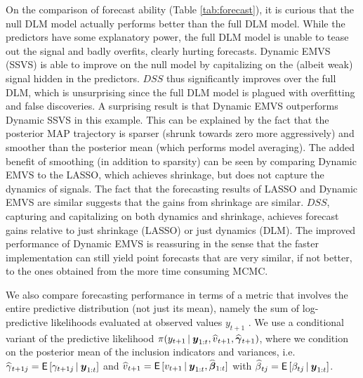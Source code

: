 \documentclass[ba]{imsart}
\numberwithin{equation}{section}
\theoremstyle{plain}
\def\y{\mbox{\boldmath$y$}}
\def\b{\mbox{\boldmath$b$}}
\newcommand{\bm}[1]{\boldsymbol{#1}}
\newcommand{\E}{\mathsf{E\,}}
\newcommand{\wh}[1]{\smash{\widehat{#1}}}
\def\C {\,|\:}
\def\C {\,|\:}
\def\y{\bm{y}}
\def\bg{\bm{\gamma}}
\def\b{\bm{\beta}}
\begin{document}
{{ 
On the comparison of forecast ability  (Table \ref{tab:forecast}), it is curious that the null DLM model  actually performs better than the full DLM model. While the predictors have some explanatory power, the full DLM model is unable 
to tease out the signal and badly overfits, clearly hurting forecasts.
Dynamic EMVS (SSVS) is able to improve on the null model by capitalizing on the (albeit weak) signal hidden in the predictors.
$DSS$  thus significantly improves over the full DLM, which is unsurprising since the full DLM model is plagued with overfitting and false discoveries.
A surprising result is that Dynamic EMVS outperforms Dynamic SSVS in this example. This can be explained by the fact that  the posterior MAP trajectory is  sparser (shrunk towards zero more aggressively) and smoother than the posterior mean (which performs model averaging).  The added benefit of smoothing (in addition to sparsity) can be seen by comparing Dynamic EMVS to the  LASSO, which  achieves shrinkage, but does not capture the dynamics of signals.
The fact that the forecasting results of LASSO and Dynamic EMVS are similar suggests that the gains from shrinkage are similar.
$DSS$, capturing and capitalizing on both dynamics and shrinkage, achieves  forecast gains relative to just shrinkage (LASSO) or just dynamics (DLM).
The improved performance of Dynamic EMVS  is reassuring in the sense that the faster implementation can still yield  point forecasts that are very similar, if not better, 
to the ones obtained from the more time consuming MCMC.  

We also compare forecasting performance in terms of a metric that involves the entire predictive distribution (not just its mean), namely the sum of log-predictive likelihoods evaluated at observed values $y_{t+1}$ \citep{KoopKorobilis2012}. 
We use a conditional variant of the predictive likelihood $\pi(y_{t+1}\C \y_{1:t},\wh v_{t+1},\wh \bg_{t+1})$, where we condition on the posterior mean of the inclusion indicators and variances, i.e. $\wh \gamma_{t+1j}=\E[\gamma_{t+1j}\C \y_{1:t}]$ and $\wh v_{t+1}=\E[v_{t+1}\C \y_{1: t},\wh\b_{1:t}]$  with $\wh\beta_{tj}=\E[\beta_{tj}\C\y_{1:t}]$.


}

}
\end{document}
